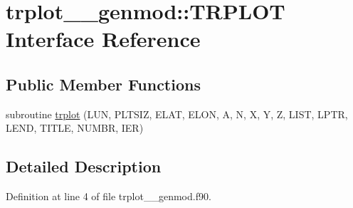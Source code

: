 \hypertarget{interfacetrplot____genmod_1_1TRPLOT}{\section{trplot\+\_\+\+\_\+genmod\+:\+:T\+R\+P\+L\+O\+T Interface Reference}
\label{interfacetrplot____genmod_1_1TRPLOT}
}
\subsection*{Public Member Functions}
\begin{DoxyCompactItemize}
\item 
subroutine \hyperlink{interfacetrplot____genmod_1_1TRPLOT_a8ffb60ef0c246eec7521240bde342c2c}{trplot} (L\+U\+N, P\+L\+T\+S\+I\+Z, E\+L\+A\+T, E\+L\+O\+N, A, N, X, Y, Z, L\+I\+S\+T, L\+P\+T\+R, L\+E\+N\+D, T\+I\+T\+L\+E, N\+U\+M\+B\+R, I\+E\+R)
\end{DoxyCompactItemize}


\subsection{Detailed Description}


Definition at line 4 of file trplot\+\_\+\+\_\+genmod.\+f90.



